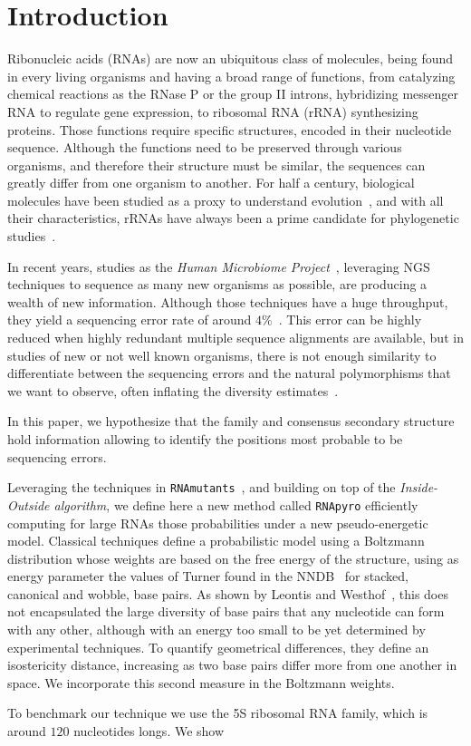 \section{Introduction}
\label{sec:introduction}

Ribonucleic acids (RNAs) are  now  an ubiquitous class of molecules, being
found in every living organisms and having a broad range of functions, from catalyzing
chemical reactions as the RNase P or the group II introns,
hybridizing  messenger RNA to regulate gene expression,
to ribosomal RNA (rRNA) synthesizing proteins.
Those functions  require specific structures, 
encoded in their nucleotide sequence. Although the functions
need to be preserved through various organisms, and therefore
their structure must be similar,  the sequences
can greatly differ from one organism to another.
For half a century, biological molecules have been studied as a proxy to understand
evolution~\cite{Zuckerkandl1965}, and with all their characteristics, rRNAs have
always been a prime candidate for phylogenetic studies~\cite{Olsen1986, Olsen1993}.

In recent years, studies as the \emph{Human Microbiome Project}~\cite{Turnbaugh2007}, 
leveraging NGS techniques to sequence as many new organisms 
as possible, are producing a wealth of new information. Although
those techniques have a huge throughput, they yield a sequencing error rate of around
$4\%$~\cite{Huse2007}. This error can be highly reduced  when highly 
redundant multiple sequence alignments 
 are available, but in studies of new or not well known organisms, there is not
 enough  similarity to differentiate between the sequencing errors and the natural 
 polymorphisms that we want to observe, often inflating the diversity estimates~\cite{Kunin2010}.
 
 
In this paper, we hypothesize that the family and consensus secondary structure hold 
information allowing to identify the positions most probable to be sequencing errors.

Leveraging the techniques  in \texttt{RNAmutants}~\cite{Waldispuhl2008}, and building on top 
of the \emph{Inside-Outside algorithm}, we define here a new method called \texttt{RNApyro}
efficiently computing for large RNAs those probabilities under a new 
pseudo-energetic model.
 Classical techniques define a probabilistic model using a Boltzmann distribution 
whose weights are based on the free energy of the structure, using as energy parameter
the values of Turner found in the NNDB~\cite{Turner2010}  for stacked, 
canonical and wobble, base pairs. As shown by Leontis and Westhof~\cite{Leontis2001},
this  does not encapsulated the large diversity of base pairs that any nucleotide
can form with any other, although with an energy too small to be yet determined
by experimental techniques. To quantify geometrical differences, they
 define an isostericity distance, increasing as two base pairs differ 
 more from one another in space. We incorporate this second measure in the Boltzmann weights.
 


To benchmark our technique we use the 5S ribosomal RNA family,
 which is around $120$ nucleotides longs. We show 